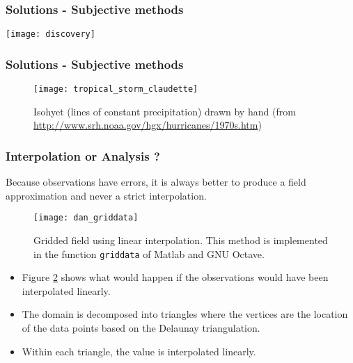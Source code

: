 
\begin{frame}
\frametitle{Solutions - Subjective methods}

\centerline{
\texttt{[image: discovery]}
}
\end{frame}


\begin{frame}
\frametitle{Solutions - Subjective methods}

\begin{figure}[H]
\centerline{\texttt{[image: tropical\_storm\_claudette]}}
\caption{Isohyet (lines of constant precipitation) drawn by hand (from \url{http://www.srh.noaa.gov/hgx/hurricanes/1970s.htm})}
\label{fig:byhand}
\end{figure}

\end{frame}


\begin{frame}
\frametitle{Interpolation or Analysis ?}

Because observations have errors, it is always better to produce a
field approximation and never a strict interpolation. 

\begin{figure}[H]
\centerline{\texttt{[image: dan\_griddata]}}
\caption{Gridded field using linear interpolation. This method is
  implemented in the function \texttt{griddata} of Matlab and GNU
  Octave.}
\label{dan_griddata}
\end{figure}

\vspace{-1cm}

{\fontsize{9pt}{10}\selectfont
\begin{itemize}
\item Figure
\ref{dan_griddata} shows what would happen if the observations would
have been interpolated linearly. 
\item The domain is
  decomposed into triangles where the vertices are the location of the
  data points based on the Delaunay triangulation. 
\item Within each
  triangle, the value is interpolated linearly. 
\end{itemize}
}

\end{frame}

